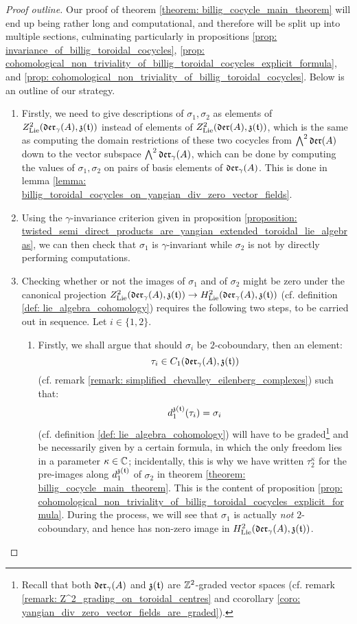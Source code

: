             \begin{proof}[Proof outline]
                Our proof of theorem \ref{theorem: billig_cocycle_main_theorem} will end up being rather long and computational, and therefore will be split up into multiple sections, culminating particularly in propositions \ref{prop: invariance_of_billig_toroidal_cocycles}, \ref{prop: cohomological_non_triviality_of_billig_toroidal_cocycles_explicit_formula}, and \ref{prop: cohomological_non_triviality_of_billig_toroidal_cocycles}. Below is an outline of our strategy.
                \begin{enumerate}
                    \item Firstly, we need to give descriptions of $\sigma_1, \sigma_2$ as elements of $Z^2_{\mathrm{Lie}}(\mathfrak{der}_{\gamma}(A), \mathfrak{z}(\mathfrak{t}))$ instead of elements of $Z^2_{\mathrm{Lie}}(\mathfrak{der}(A), \mathfrak{z}(\mathfrak{t}))$, which is the same as computing the domain restrictions of these two cocycles from $\bigwedge^2 \mathfrak{der}(A)$ down to the vector subspace $\bigwedge^2 \mathfrak{der}_{\gamma}(A)$, which can be done by computing the values of $\sigma_1, \sigma_2$ on pairs of basis elements of $\mathfrak{der}_{\gamma}(A)$. This is done in lemma \ref{lemma: billig_toroidal_cocycles_on_yangian_div_zero_vector_fields}.
                    \item Using the $\gamma$-invariance criterion given in proposition \ref{proposition: twisted_semi_direct_products_are_yangian_extended_toroidal_lie_algebras}, we can then check that $\sigma_1$ is $\gamma$-invariant while $\sigma_2$ is not by directly performing computations.
                    \item Checking whether or not the images of $\sigma_1$ and of $\sigma_2$ might be zero under the canonical projection $Z^2_{\mathrm{Lie}}(\mathfrak{der}_{\gamma}(A), \mathfrak{z}(\mathfrak{t})) \to H^2_{\mathrm{Lie}}(\mathfrak{der}_{\gamma}(A), \mathfrak{z}(\mathfrak{t}))$ (cf. definition \ref{def: lie_algebra_cohomology}) requires the following two steps, to be carried out in sequence. Let $i \in \{1, 2\}$.
                    \begin{enumerate}
                        \item Firstly, we shall argue that should $\sigma_i$ be $2$-coboundary, then an element:
                            $$\tau_i \in C_1(\mathfrak{der}_{\gamma}(A), \mathfrak{z}(\mathfrak{t}))$$
                        (cf. remark \ref{remark: simplified_chevalley_eilenberg_complexes}) such that:
                            $$d_1^{\mathfrak{z}(\mathfrak{t})}(\tau_i) = \sigma_i$$
                        (cf. definition \ref{def: lie_algebra_cohomology}) will have to be graded\footnote{Recall that both $\mathfrak{der}_{\gamma}(A)$ and $\mathfrak{z}(\mathfrak{t})$ are $\mathbb{Z}^2$-graded vector spaces (cf. remark \ref{remark: Z^2_grading_on_toroidal_centres} and ccorollary \ref{coro: yangian_div_zero_vector_fields_are_graded}).} and be necessarily given by a certain formula, in which the only freedom lies in a parameter $\kappa \in \mathbb{C}$; incidentally, this is why we have written $\tau_2^{\kappa}$ for the pre-images along $d_1^{\mathfrak{z}(\mathfrak{t})}$ of $\sigma_2$ in theorem \ref{theorem: billig_cocycle_main_theorem}. This is the content of proposition \ref{prop: cohomological_non_triviality_of_billig_toroidal_cocycles_explicit_formula}. During the process, we will see that $\sigma_1$ is actually \textit{not} $2$-coboundary, and hence has non-zero image in $H^2_{\mathrm{Lie}}(\mathfrak{der}_{\gamma}(A), \mathfrak{z}(\mathfrak{t}))$.

\end{enumerate}
\end{enumerate}
\end{proof}
